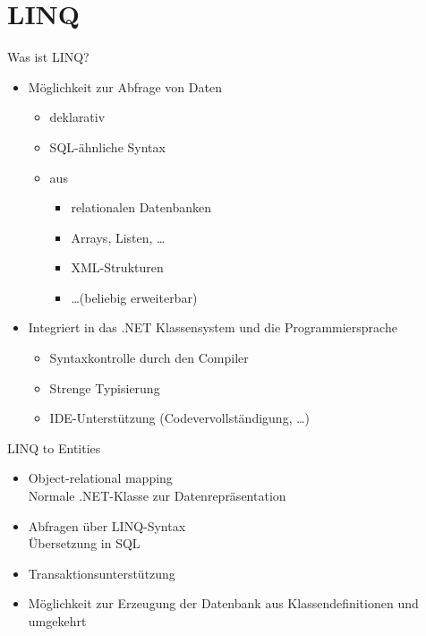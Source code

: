\section{LINQ}
\begin{frame}{Was ist LINQ?}
\begin{itemize}
	\item Möglichkeit zur Abfrage von Daten
\begin{itemize}
\item deklarativ
\item SQL-ähnliche Syntax
\item aus
\begin{itemize}
\item  relationalen Datenbanken
\item Arrays, Listen, \ldots
\item XML-Strukturen
\item \ldots (beliebig erweiterbar)
\end{itemize}
\end{itemize}
\item  Integriert in das .NET Klassensystem und die Programmiersprache
\begin{itemize}
\item Syntaxkontrolle durch den Compiler
\item Strenge Typisierung
\item IDE-Unterstützung (Codevervollständigung, …)
\end{itemize}
\end{itemize}
\end{frame}

\begin{frame}{LINQ to Entities}
\begin{itemize}
\item Object-relational mapping\\
	Normale .NET-Klasse zur Datenrepräsentation
\item Abfragen über LINQ-Syntax\\
	Übersetzung in SQL
\item Transaktionsunterstützung
\item Möglichkeit zur Erzeugung der Datenbank aus Klassendefinitionen und umgekehrt
\end{itemize}
\end{frame}



